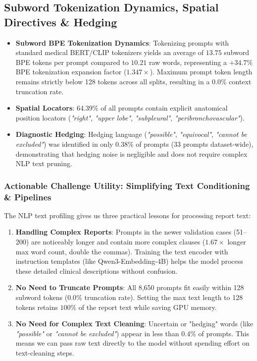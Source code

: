 \documentclass[11pt,a4paper]{article}
\begin{document}
\subsection{Subword Tokenization Dynamics, Spatial Directives \& Hedging}
\begin{itemize}
    \item \textbf{Subword BPE Tokenization Dynamics}: Tokenizing prompts with standard medical BERT/CLIP tokenizers yields an average of $13.75$ subword BPE tokens per prompt compared to $10.21$ raw words, representing a $+34.7\%$ BPE tokenization expansion factor ($1.347\times$). Maximum prompt token length remains strictly below 128 tokens across all splits, resulting in a $0.0\%$ context truncation rate.
    \item \textbf{Spatial Locators}: 64.39\% of all prompts contain explicit anatomical position locators (\textit{"right"}, \textit{"upper lobe"}, \textit{"subpleural"}, \textit{"peribronchovascular"}).
    \item \textbf{Diagnostic Hedging}: Hedging language (\textit{"possible"}, \textit{"equivocal"}, \textit{"cannot be excluded"}) was identified in only 0.38\% of prompts (33 prompts dataset-wide), demonstrating that hedging noise is negligible and does not require complex NLP text pruning.
\end{itemize}

\subsubsection*{Actionable Challenge Utility: Simplifying Text Conditioning \& Pipelines}
The NLP text profiling gives us three practical lessons for processing report text:
\begin{enumerate}
    \item \textbf{Handling Complex Reports}: Prompts in the newer validation cases (51--200) are noticeably longer and contain more complex clauses ($1.67\times$ longer max word count, double the commas). Training the text encoder with instruction templates (like Qwen3-Embedding-4B) helps the model process these detailed clinical descriptions without confusion.
    \item \textbf{No Need to Truncate Prompts}: All 8,650 prompts fit easily within 128 subword tokens ($0.0\%$ truncation rate). Setting the max text length to 128 tokens retains $100\%$ of the report text while saving GPU memory.
    \item \textbf{No Need for Complex Text Cleaning}: Uncertain or "hedging" words (like \textit{"possible"} or \textit{"cannot be excluded"}) appear in less than $0.4\%$ of prompts. This means we can pass raw text directly to the model without spending effort on text-cleaning steps.
\end{enumerate}
\end{document}
